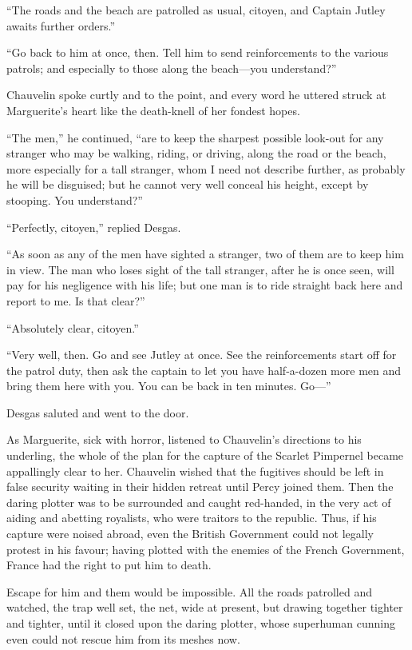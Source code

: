 \documentclass[paper=a5,BCOR=7mm,twoside,DIV=calc,12pt,usegeometry,chapterprefix,endperiod,headings=big]{scrbook}
\begin{document}
\enquote{The roads and the beach are patrolled as usual, citoyen, and Captain Jutley awaits further orders.}

\enquote{Go back to him at once, then. Tell him to send reinforcements to the various patrols; and especially to those along the beach---you understand?}

Chauvelin spoke curtly and to the point, and every word he uttered struck at Marguerite's heart like the death-knell of her fondest hopes.

\enquote{The men,} he continued, \enquote{are to keep the sharpest possible look-out for any stranger who may be walking, riding, or driving, along the road or the beach, more especially for a tall stranger, whom I need not describe further, as probably he will be disguised; but he cannot very well conceal his height, except by stooping. You understand?}

\enquote{Perfectly, citoyen,} replied Desgas.

\enquote{As soon as any of the men have sighted a stranger, two of them are to keep him in view. The man who loses sight of the tall stranger, after he is once seen, will pay for his negligence with his life; but one man is to ride straight back here and report to me. Is that clear?}

\enquote{Absolutely clear, citoyen.}

\enquote{Very well, then. Go and see Jutley at once. See the reinforcements start off for the patrol duty, then ask the captain to let you have half-a-dozen more men and bring them here with you. You can be back in ten minutes. Go---}

Desgas saluted and went to the door.

As Marguerite, sick with horror, listened to Chauvelin's directions to his underling, the whole of the plan for the capture of the Scarlet Pimpernel became appallingly clear to her. Chauvelin wished that the fugitives should be left in false security waiting in their hidden retreat until Percy joined them. Then the daring plotter was to be surrounded and caught red-handed, in the very act of aiding and abetting royalists, who were traitors to the republic. Thus, if his capture were noised abroad, even the British Government could not legally protest in his favour; having plotted with the enemies of the French Government, France had the right to put him to death.

Escape for him and them would be impossible. All the roads patrolled and watched, the trap well set, the net, wide at present, but drawing together tighter and tighter, until it closed upon the daring plotter, whose superhuman cunning even could not rescue him from its meshes now.
\end{document}
